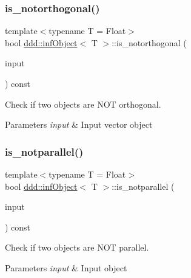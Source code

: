 \subsubsection{\texorpdfstring{is\+\_\+notorthogonal()}{is\_notorthogonal()}}
{\footnotesize\ttfamily template$<$typename T = Float$>$ \\
bool \hyperlink{classddd_1_1inf_object}{ddd\+::inf\+Object}$<$ T $>$\+::is\+\_\+notorthogonal (\begin{DoxyParamCaption}\item[{const \hyperlink{classddd_1_1inf_object}{inf\+Object}$<$ T $>$ \&}]{input }\end{DoxyParamCaption}) const\hspace{0.3cm}{\ttfamily [inline]}}



Check if two objects are N\+OT orthogonal. 


\begin{DoxyParams}{Parameters}
{\em input} & Input vector object \\
\hline
\end{DoxyParams}
\mbox{\label{classddd_1_1inf_object_af3ca07b7ad46945dddb3a94121c74c1d}} 
\subsubsection{\texorpdfstring{is\+\_\+notparallel()}{is\_notparallel()}}
{\footnotesize\ttfamily template$<$typename T = Float$>$ \\
bool \hyperlink{classddd_1_1inf_object}{ddd\+::inf\+Object}$<$ T $>$\+::is\+\_\+notparallel (\begin{DoxyParamCaption}\item[{const \hyperlink{classddd_1_1inf_object}{inf\+Object}$<$ T $>$ \&}]{input }\end{DoxyParamCaption}) const\hspace{0.3cm}{\ttfamily [inline]}}



Check if two objects are N\+OT parallel. 


\begin{DoxyParams}{Parameters}
{\em input} & Input object \\
\hline
\end{DoxyParams}
\mbox{\label{classddd_1_1inf_object_aca80af28af48b48a58c237dbebd889d0}} 
